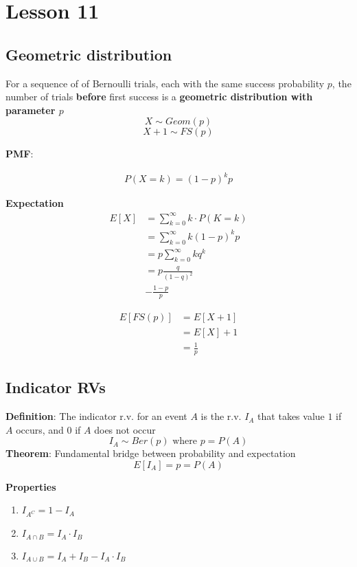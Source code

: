 \chapter{Lesson 11}

\section{Geometric distribution}

\begin{framed}
   For a sequence of of Bernoulli trials, each with the same success probability $p$, the number of trials \textbf{before} first success is a \textbf{geometric distribution with parameter $p$}
   \[
     X \sim Geom(p)
   \] 
   \[
     X + 1 \sim FS(p)
   \] 

   \textbf{PMF}:

   \begin{align*}
      P(X = k) = (1 - p)^k p
   \end{align*}

   \textbf{Expectation}
   \begin{align*}
      E[X] &= \sum_{k = 0}^{\infty} k \cdot P(K = k) \\
           &= \sum_{k = 0}^{\infty}k (1-p)^k p \\
           &= p\sum_{k = 0}^{\infty}k q^k  \\
           &= p \frac{q}{(1-q)^2}  \\ 
           &- \frac{1 - p}{p}
   \end{align*}

   \begin{align*}
      E[FS(p)] &= E[X + 1] \\
      &= E[X] + 1 \\
      &= \frac{1}{p}
   \end{align*}
\end{framed}

\section{Indicator RVs}

\begin{framed}
   \textbf{Definition}: The indicator r.v. for an event $A$ is the r.v. $I_A$ that takes value $1$ if $A$ occurs, and $0$ if $A$ does not occur 
   \[
     I_A \sim Ber(p) \text{ where } p = P(A)
   \] 
   \textbf{Theorem}: Fundamental bridge between probability and expectation
   \[
      E[I_A] = p = P(A)
   \] 

   \textbf{Properties}
   \begin{enumerate}
      \item $I_{A^C} = 1 - I_A $
      \item $I_{A \cap B} = I_A \cdot  I_B$
      \item $I_{A \cup B} = I_A + I_B - I_A \cdot I_B$
   \end{enumerate}
\end{framed}

